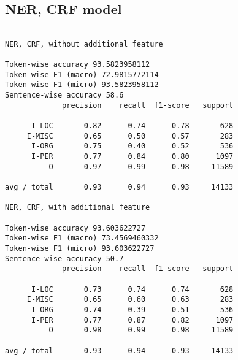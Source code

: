 \documentclass[twoside]{article}
\begin{document}
\subsection{NER, CRF model} 
\begin{lstlisting}

NER, CRF, without additional feature

Token-wise accuracy 93.5823958112
Token-wise F1 (macro) 72.9815772114
Token-wise F1 (micro) 93.5823958112
Sentence-wise accuracy 58.6
             precision    recall  f1-score   support

      I-LOC       0.82      0.74      0.78       628
     I-MISC       0.65      0.50      0.57       283
      I-ORG       0.75      0.40      0.52       536
      I-PER       0.77      0.84      0.80      1097
          O       0.97      0.99      0.98     11589

avg / total       0.93      0.94      0.93     14133

NER, CRF, with additional feature

Token-wise accuracy 93.603622727
Token-wise F1 (macro) 73.4569460332
Token-wise F1 (micro) 93.603622727
Sentence-wise accuracy 50.7
             precision    recall  f1-score   support

      I-LOC       0.73      0.74      0.74       628
     I-MISC       0.65      0.60      0.63       283
      I-ORG       0.74      0.39      0.51       536
      I-PER       0.77      0.87      0.82      1097
          O       0.98      0.99      0.98     11589

avg / total       0.93      0.94      0.93     14133

\end{lstlisting} 
\end{document}

